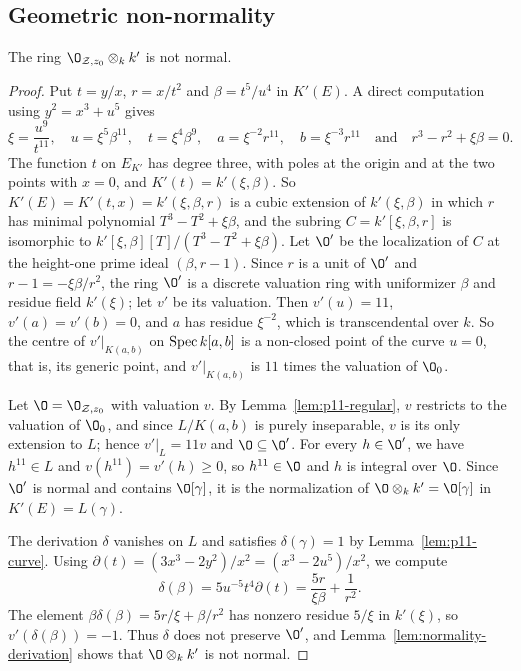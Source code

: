 \subsection{Geometric non-normality}

\begin{lemma}\label{lem:p11-nonnormal}
The ring $\O_{\mathcal Z,z_0}\otimes_kk'$ is not normal.
\end{lemma}

\begin{proof}
Put $t = y/x$, $r = x/t^2$ and $\beta = t^5/u^4$ in $K'(E)$.
A direct computation using $y^2 = x^3+u^5$ gives
\[
  \xi = \frac{u^9}{t^{11}},\quad u = \xi^5\beta^{11},\quad t = \xi^4\beta^9,\quad a = \xi^{-2}r^{11},\quad b = \xi^{-3}r^{11}\quad\text{and}\quad r^3-r^2+\xi\beta = 0.
\]
The function $t$ on $E_{K'}$ has degree three, with poles at the origin and at the two points with $x = 0$, and $K'(t) = k'(\xi,\beta)$.
So $K'(E) = K'(t,x) = k'(\xi,\beta,r)$ is a cubic extension of $k'(\xi,\beta)$ in which $r$ has minimal polynomial $T^3-T^2+\xi\beta$, and the subring $C = k'[\xi,\beta,r]$ is isomorphic to $k'[\xi,\beta][T]/(T^3-T^2+\xi\beta)$.
Let $\O'$ be the localization of $C$ at the height-one prime ideal $(\beta,r-1)$.
Since $r$ is a unit of $\O'$ and $r-1 = -\xi\beta/r^2$, the ring $\O'$ is a discrete valuation ring with uniformizer $\beta$ and residue field $k'(\xi)$; let $v'$ be its valuation.
Then $v'(u) = 11$, $v'(a) = v'(b) = 0$, and $a$ has residue $\xi^{-2}$, which is transcendental over $k$.
So the centre of $v'|_{K(a,b)}$ on $\operatorname{Spec} k[a,b]$ is a non-closed point of the curve $u = 0$, that is, its generic point, and $v'|_{K(a,b)}$ is $11$ times the valuation of $\O_0$.

Let $\O = \O_{\mathcal Z,z_0}$ with valuation $v$.
By Lemma~\ref{lem:p11-regular}, $v$ restricts to the valuation of $\O_0$, and since $L/K(a,b)$ is purely inseparable, $v$ is its only extension to $L$; hence $v'|_L = 11v$ and $\O\subseteq\O'$.
For every $h\in\O'$, we have $h^{11}\in L$ and $v(h^{11}) = v'(h)\geq 0$, so $h^{11}\in\O$ and $h$ is integral over $\O$.
Since $\O'$ is normal and contains $\O[\gamma]$, it is the normalization of $\O\otimes_kk' = \O[\gamma]$ in $K'(E) = L(\gamma)$.

The derivation $\delta$ vanishes on $L$ and satisfies $\delta(\gamma) = 1$ by Lemma~\ref{lem:p11-curve}.
Using $\partial(t) = (3x^3-2y^2)/x^2 = (x^3-2u^5)/x^2$, we compute
\[
  \delta(\beta) = 5u^{-5}t^4\partial(t) = \frac{5r}{\xi\beta}+\frac{1}{r^2}.
\]
The element $\beta\delta(\beta) = 5r/\xi+\beta/r^2$ has nonzero residue $5/\xi$ in $k'(\xi)$, so $v'(\delta(\beta)) = -1$.
Thus $\delta$ does not preserve $\O'$, and Lemma~\ref{lem:normality-derivation} shows that $\O\otimes_kk'$ is not normal.
\end{proof}

